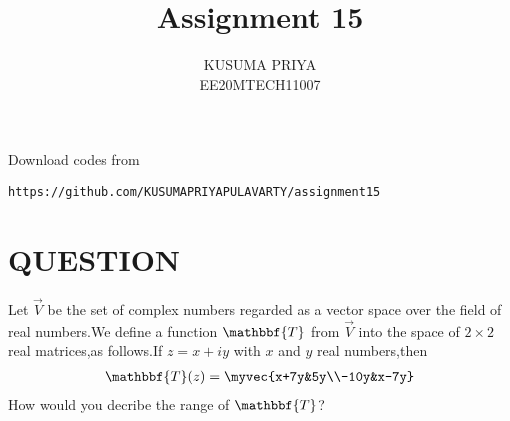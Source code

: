 \documentclass[journal,12pt,twocolumn]{IEEEtran}
\begin{document}
\renewcommand{\thefigure}{\theproblem}

\def\putbox#1#2#3{\makebox[0in][l]{\makebox[#1][l]{}\raisebox{\baselineskip}[0in][0in]{\raisebox{#2}[0in][0in]{#3}}}}
     \def\rightbox#1{\makebox[0in][r]{#1}}
     \def\centbox#1{\makebox[0in]{#1}}
     \def\topbox#1{\raisebox{-\baselineskip}[0in][0in]{#1}}
     \def\midbox#1{\raisebox{-0.5\baselineskip}[0in][0in]{#1}}
\vspace{3cm}
\title{Assignment 15}
\author{KUSUMA PRIYA\\EE20MTECH11007}

\maketitle
\newpage

\bigskip
\renewcommand{\thefigure}{\theenumi}
\renewcommand{\thetable}{\theenumi}
Download codes from 
%
\begin{lstlisting}
https://github.com/KUSUMAPRIYAPULAVARTY/assignment15
\end{lstlisting}
%
 
 \section{QUESTION}
Let $\vec{V}$ be the set of complex numbers regarded as a vector space over the field of real numbers.We define a function $\mathbbf{T}$ from $\vec{V}$ into the space of $2 \times 2$ real matrices,as follows.If $z=x+i y$ with $x$ and $y$ real numbers,then 
\begin{align}
\mathbbf{T}(z)=\myvec{x+7y&5y\\-10y&x-7y}\label{1}
\end{align}
How would you decribe the range of $\mathbbf{T}$?
%
\end{document}
